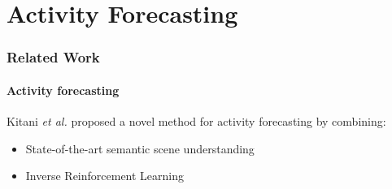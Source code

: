 \section{Activity Forecasting}

\begin{frame}
	\frametitle{Related Work}
	\framesubtitle{Activity forecasting}
	
	\vspace{0.4cm}
	
	Kitani \emph{et al.} \cite{Kitani12} proposed a novel method for activity forecasting
	by combining:
	
	\begin{itemize}
		\item State-of-the-art semantic scene understanding
		\vspace{0.05cm}
		\item Inverse Reinforcement Learning
	\end{itemize}
	
	\begin{center}
	\end{center}
\end{frame}

